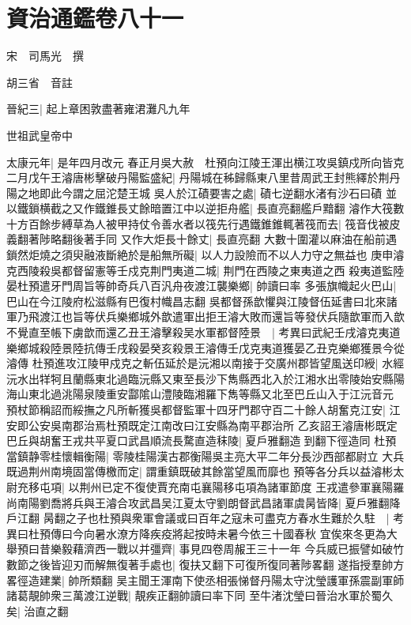 \section{資治通鑑卷八十一}
宋　司馬光　撰

胡三省　音註

晉紀三|{
	起上章困敦盡著雍涒灘凡九年}


世祖武皇帝中

太康元年|{
	是年四月改元}
春正月吳大赦　杜預向江陵王渾出横江攻吳鎮戍所向皆克二月戊午王濬唐彬擊破丹陽監盛紀|{
	丹陽城在秭歸縣東八里昔周武王封熊繹於荆丹陽之地即此今謂之屈沱楚王城}
吳人於江磧要害之處|{
	磧七逆翻水渚有沙石曰磧}
並以鐵鎖横截之又作鐵錐長丈餘暗置江中以逆拒舟艦|{
	長直亮翻艦戶黯翻}
濬作大筏數十方百餘步縛草為人被甲持仗令善水者以筏先行遇鐵錐錐輒著筏而去|{
	筏音伐被皮義翻著陟略翻後著手同}
又作大炬長十餘丈|{
	長直亮翻}
大數十圍灌以麻油在船前遇鎖然炬燒之須臾融液斷絶於是船無所礙|{
	以人力設險而不以人力守之無益也}
庚申濬克西陵殺吳都督留憲等壬戍克荆門夷道二城|{
	荆門在西陵之東夷道之西}
殺夷道監陸晏杜預遣牙門周旨等帥奇兵八百汎舟夜渡江襲樂鄉|{
	帥讀曰率}
多張旗幟起火巴山|{
	巴山在今江陵府松滋縣有巴復村幟昌志翻}
吳都督孫歆懼與江陵督伍延書曰北來諸軍乃飛渡江也旨等伏兵樂鄉城外歆遣軍出拒王濬大敗而還旨等發伏兵隨歆軍而入歆不覺直至帳下虜歆而還乙丑王濬擊殺吴水軍都督陸景　|{
	考異曰武紀壬戌濬克夷道樂鄉城殺陸景陸抗傳壬戌殺晏癸亥殺景王濬傳壬戊克夷道獲晏乙丑克樂鄉獲景今從濬傳}
杜預進攻江陵甲戍克之斬伍延於是沅湘以南接于交廣州郡皆望風送印綬|{
	水經沅水出䍧牱且蘭縣東北過臨沅縣又東至長沙下雋縣西北入於江湘水出零陵始安縣陽海山東北過洮陽泉陵重安酃隂山澧陵臨湘羅下雋等縣又北至巴丘山入于江沅音元}
預杖節稱詔而綏撫之凡所斬獲吳都督監軍十四牙門郡守百二十餘人胡奮克江安|{
	江安即公安吳南郡治焉杜預既定江南改曰江安縣為南平郡治所}
乙亥詔王濬唐彬既定巴丘與胡奮王戎共平夏口武昌順流長騖直造秣陵|{
	夏戶雅翻造到翻下徑造同}
杜預當鎮静零桂懷輯衡陽|{
	零陵桂陽漢古郡衡陽吳主亮大平二年分長沙西部都尉立}
大兵既過荆州南境固當傳檄而定|{
	謂重鎮既破其餘當望風而靡也}
預等各分兵以益濬彬太尉充移屯項|{
	以荆州已定不復使賈充南屯襄陽移屯項為諸軍節度}
王戎遣參軍襄陽羅尚南陽劉喬將兵與王濬合攻武昌吴江夏太守劉朗督武昌諸軍虞昺皆降|{
	夏戶雅翻降戶江翻}
昺翻之子也杜預與衆軍會議或曰百年之寇未可盡克方春水生難於久駐　|{
	考異曰杜預傳曰今向暑水潦方降疾疫將起按時未暑今依三十國春秋}
宜俟來冬更為大舉預曰昔樂毅藉濟西一戰以并彊齊|{
	事見四卷周赧王三十一年}
今兵威已振譬如破竹數節之後皆迎刃而解無復著手處也|{
	復扶又翻下可復所復同著陟畧翻}
遂指授羣帥方畧徑造建業|{
	帥所類翻}
吴主聞王渾南下使丞相張悌督丹陽太守沈瑩護軍孫震副軍師諸葛靚帥衆三萬渡江逆戰|{
	靚疾正翻帥讀曰率下同}
至牛渚沈瑩曰晉治水軍於蜀久矣|{
	治直之翻}
